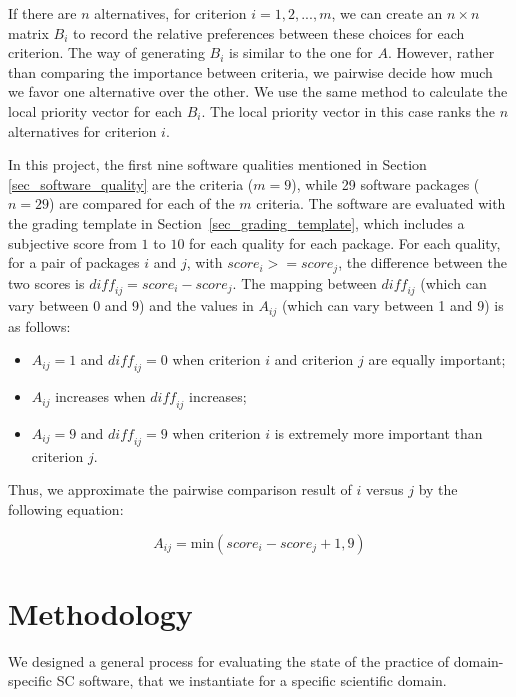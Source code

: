 \documentclass[3p, 12pt,authoryear]{elsarticle}
\begin{document}
If there are $n$ alternatives, for criterion $i = 1, 2, ... , m$, we can create
an $n\times n$ matrix $B_i$ to record the relative preferences between these
choices for each criterion. The way of generating $B_i$ is similar to the one
for $A$. However, rather than comparing the importance between criteria, we
pairwise decide how much we favor one alternative over the other. We use the
same method to calculate the local priority vector for each $B_i$.  The local
priority vector in this case ranks the $n$ alternatives for criterion $i$.

In this project, the first nine software qualities mentioned in Section
\ref{sec_software_quality} are the criteria ($m = 9$), while 29 software
packages ($n = 29$) are compared for each of the $m$ criteria. The software are
evaluated with the grading template in Section~\ref{sec_grading_template}, which
includes a subjective score from $1$ to $10$ for each quality for each package.
For each quality, for a pair of packages $i$ and $j$, with $\mathit{score}_i >=
\mathit{score}_j$, the difference between the two scores is $\mathit{diff_{ij}}
= \mathit{score}_i - \mathit{score}_j$. The mapping between $\mathit{diff_{ij}}$
(which can vary between 0 and 9) and the values in $A_{ij}$ (which can vary
between 1 and 9) is as follows:

\begin{itemize}
\item $A_{ij} = 1$ and $\mathit{diff_{ij}} = 0$ when criterion $i$ and criterion
$j$ are equally important;
\item $A_{ij}$ increases when $\mathit{diff_{ij}}$ increases;
\item $A_{ij} = 9$ and $\mathit{diff_{ij}} = 9$ when criterion $i$ is extremely
more important than criterion $j$.
\end{itemize}

\noindent Thus, we approximate the pairwise comparison result of $i$ versus $j$
by the following equation:

\begin{equation}
A_{ij} = \text{min}(\mathit{score}_i - \mathit{score}_j + 1, 9)
\end{equation}

\section{Methodology} \label{ch_methods}

We designed a general process for evaluating the state of the practice of
domain-specific SC software, that we instantiate for a specific scientific
domain.
\end{document}
